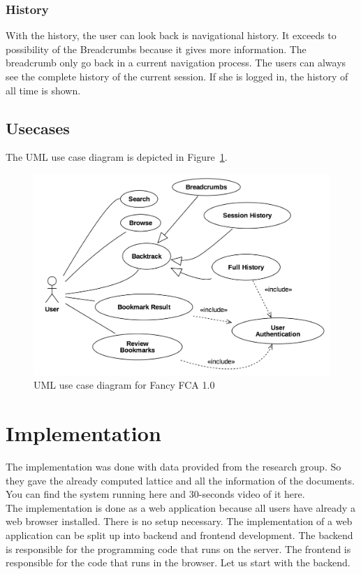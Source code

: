 \documentclass[11pt]{report}
\begin{document}
\subsubsection{History}

With the history, the user can look back is navigational history. It exceeds to possibility of the Breadcrumbs because it gives more information. The breadcrumb only go back in a current navigation process. The users can always see the complete history of the current session. If she is logged in, the history of all time is shown.

\subsection{Usecases}
The UML use case diagram is depicted in Figure~\ref{figure:usecase}.

\begin{figure}[!ht]
	\centering
	\includegraphics[width=\linewidth]{images/usecase}
\caption{UML use case diagram for Fancy FCA 1.0}
\label{figure:usecase}
\end{figure}

\section{Implementation}

The implementation was done with data provided from the research group. So they gave the already computed lattice and all the information of the documents. You can find the system running here and 30-seconds video of it here. \\

The implementation is done as a web application because all users have already a web browser installed. There is no setup necessary. The implementation of a web application can be split up into backend and frontend development. The backend is responsible for the programming code that runs on the server. The frontend is responsible for the code that runs in the browser. Let us start with the backend.
\end{document}
